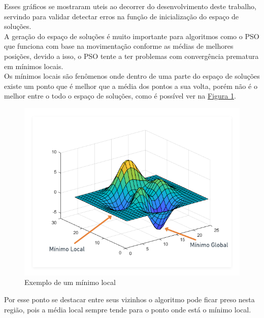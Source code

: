 Esses gráficos se mostraram uteis ao decorrer do desenvolvimento deste trabalho, servindo para validar detectar erros na função de inicialização do espaço de soluções.\\
\indent A geração do espaço de soluções é muito importante para algoritmos como o PSO 
que funciona com base na movimentação conforme as médias de melhores posições, 
devido a isso, o PSO tente a ter problemas com convergência prematura em mínimos locais.\\
\indent Os mínimos locais são fenômenos onde dentro de uma parte do espaço de soluções existe um ponto que é melhor que a média dos pontos a sua volta, porém não é o melhor entre o todo o espaço de soluções, como é possível ver na \hyperref[fig:ex-minimolocal]{Figura \ref{fig:ex-minimolocal}}.\newline
\begin{figure}[ht]
    \centering
    \caption{Exemplo de um mínimo local}
    \label{fig:ex-minimolocal}
    \includegraphics[width=\textwidth]{assets/minimo_local.png}
\end{figure}
Por esse ponto se destacar entre seus vizinhos o algoritmo pode ficar preso nesta região, pois a média local sempre tende para o ponto onde está o mínimo local.\\
